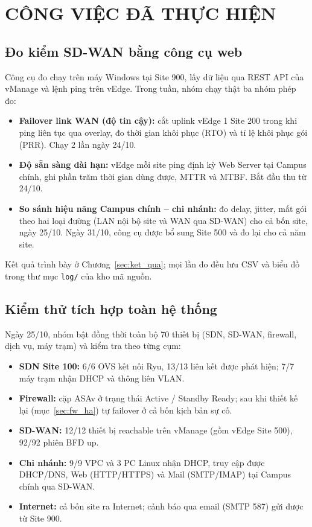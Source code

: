 \section{CÔNG VIỆC ĐÃ THỰC HIỆN}\label{sec:cong_viec}

\subsection{Đo kiểm SD-WAN bằng công cụ web}

Công cụ đo chạy trên máy Windows tại Site 900, lấy dữ liệu qua REST API của vManage và lệnh ping trên vEdge. Trong tuần, nhóm chạy thật ba nhóm phép đo:

\begin{itemize}
    \item \textbf{Failover link WAN (độ tin cậy):} cắt uplink vEdge 1 Site 200 trong khi ping liên tục qua overlay, đo thời gian khôi phục (RTO) và tỉ lệ khôi phục gói (PRR). Chạy 2 lần ngày 24/10.
    \item \textbf{Độ sẵn sàng dài hạn:} vEdge mỗi site ping định kỳ Web Server tại Campus chính, ghi phần trăm thời gian dùng được, MTTR và MTBF. Bắt đầu thu từ 24/10.
    \item \textbf{So sánh hiệu năng Campus chính -- chi nhánh:} đo delay, jitter, mất gói theo hai loại đường (LAN nội bộ site và WAN qua SD-WAN) cho cả bốn site, ngày 25/10. Ngày 31/10, công cụ được bổ sung Site 500 và đo lại cho cả năm site.
\end{itemize}

Kết quả trình bày ở Chương~\ref{sec:ket_qua}; mọi lần đo đều lưu CSV và biểu đồ trong thư mục \texttt{log/} của kho mã nguồn.

\subsection{Kiểm thử tích hợp toàn hệ thống}

Ngày 25/10, nhóm bật đồng thời toàn bộ 70 thiết bị (SDN, SD-WAN, firewall, dịch vụ, máy trạm) và kiểm tra theo từng cụm:

\begin{itemize}
    \item \textbf{SDN Site 100:} 6/6 OVS kết nối Ryu, 13/13 liên kết được phát hiện; 7/7 máy trạm nhận DHCP và thông liên VLAN.
    \item \textbf{Firewall:} cặp ASAv ở trạng thái Active / Standby Ready; sau khi thiết kế lại (mục~\ref{sec:fw_ha}) tự failover ở cả bốn kịch bản sự cố.
    \item \textbf{SD-WAN:} 12/12 thiết bị reachable trên vManage (gồm vEdge Site 500), 92/92 phiên BFD up.
    \item \textbf{Chi nhánh:} 9/9 VPC và 3 PC Linux nhận DHCP, truy cập được DHCP/DNS, Web (HTTP/HTTPS) và Mail (SMTP/IMAP) tại Campus chính qua SD-WAN.
    \item \textbf{Internet:} cả bốn site ra Internet; cảnh báo qua email (SMTP 587) gửi được từ Site 900.
\end{itemize}

